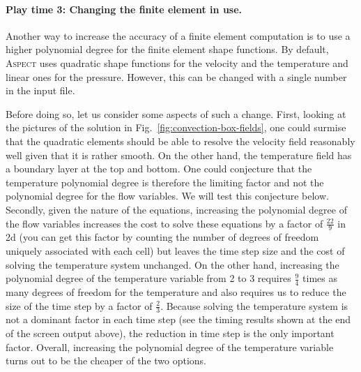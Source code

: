 \documentclass{article}
\newcommand{\aspect}{\textsc{Aspect}}
\begin{document}
\paragraph{Play time 3: Changing the finite element in use.}
Another way to increase the accuracy of a finite element computation is to use a
higher polynomial degree for the finite element shape functions. By default,
\aspect{} uses quadratic shape functions for the velocity and the temperature
and linear ones for the pressure. However, this can be changed with a single
number in the input file.

Before doing so, let us consider some aspects of such a change. First, looking
at the pictures of the solution in Fig.~\ref{fig:convection-box-fields}, one
could surmise that the quadratic elements should be able to resolve the velocity
field reasonably well given that it is rather smooth. On the other hand, the
temperature field has a boundary layer at the top and bottom. One could
conjecture that the temperature polynomial degree is therefore the limiting
factor and not the polynomial degree for the flow variables. We will test this
conjecture below. Secondly, given the nature of the equations, increasing the
polynomial degree of the flow variables increases the cost to solve these
equations by a factor of $\frac{22}{9}$ in 2d (you can get this factor by
counting the number of degrees of freedom uniquely associated with each cell) but leaves
the time step size and the cost of solving the temperature system unchanged. On
the other hand, increasing the polynomial degree of the temperature variable
from 2 to 3 requires $\frac 94$ times as many degrees of freedom for the
temperature and also requires us to reduce the size of the time step by a factor
of $\frac 23$. Because solving the temperature system is not a dominant factor
in each time step (see the timing results shown at the end of the screen output
above), the reduction in time step is the only important factor. Overall,
increasing the polynomial degree of the temperature variable turns out to be the
cheaper of the two options.
\end{document}
